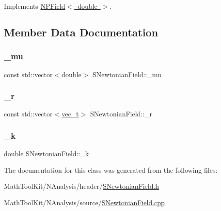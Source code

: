 Implements \mbox{\hyperlink{class_n_p_field_a6b92c4782bf41c0b81751821b93eb445}{N\+P\+Field$<$ double $>$}}.



\subsection{Member Data Documentation}
\mbox{\label{class_s_newtonian_field_a2f447c353aa350e8e06f1167077a6577}} 
\subsubsection{\texorpdfstring{\_mu}{\_mu}}
{\footnotesize\ttfamily const std\+::vector$<$double$>$ S\+Newtonian\+Field\+::\+\_\+mu\hspace{0.3cm}{\ttfamily [protected]}}

\mbox{\label{class_s_newtonian_field_ae905751c50bc53c9c9ad020d5d0b68b1}} 
\subsubsection{\texorpdfstring{\_r}{\_r}}
{\footnotesize\ttfamily const std\+::vector$<$\mbox{\hyperlink{_n_vector_8h_a0a2cfc67e738a3d73e4f12098c4c07f6}{vec\+\_\+t}}$>$ S\+Newtonian\+Field\+::\+\_\+r\hspace{0.3cm}{\ttfamily [protected]}}

\mbox{\label{class_s_newtonian_field_a6d87be6a91cbdd8b70890b00aac87127}} 
\subsubsection{\texorpdfstring{\_k}{\_k}}
{\footnotesize\ttfamily double S\+Newtonian\+Field\+::\+\_\+k\hspace{0.3cm}{\ttfamily [protected]}}



The documentation for this class was generated from the following files\+:\begin{DoxyCompactItemize}
\item 
Math\+Tool\+Kit/\+N\+Analysis/header/\mbox{\hyperlink{_s_newtonian_field_8h}{S\+Newtonian\+Field.\+h}}\item 
Math\+Tool\+Kit/\+N\+Analysis/source/\mbox{\hyperlink{_s_newtonian_field_8cpp}{S\+Newtonian\+Field.\+cpp}}\end{DoxyCompactItemize}
